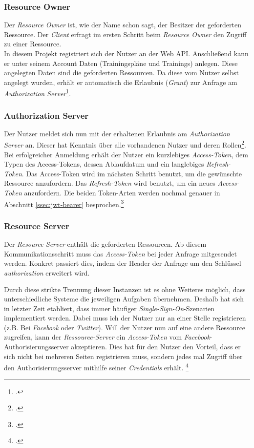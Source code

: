 \subsubsection*{Resource Owner}
Der \textit{Resource Owner} ist, wie der Name schon sagt, der Besitzer der geforderten Ressource. Der \textit{Client} erfragt im ersten Schritt beim \textit{Resource Owner} den Zugriff zu einer Ressource.\\
In diesem Projekt registriert sich der Nutzer an der Web \ac{API}. Anschließend kann er unter seinem Account Daten (Trainingspläne und Trainings) anlegen. Diese angelegten Daten sind die geforderten Ressourcen. Da diese vom Nutzer selbst angelegt wurden, erhält er automatisch die Erlaubnis (\textit{Grant}) zur Anfrage am \textit{Authorization Server}\footcite{online:Implemented_OAuth_WebToken}.
\subsubsection*{Authorization Server}
\label{sssec:authorization-server}
Der Nutzer meldet sich nun mit der erhaltenen Erlaubnis am \textit{Authorization Server} an. Dieser hat Kenntnis über alle vorhandenen Nutzer und deren Rollen\footcite{online:Implemented_OAuth_Roles}. Bei erfolgreicher Anmeldung erhält der Nutzer ein kurzlebiges \textit{Access-Token}, dem Typen des Access-Tokens, dessen Ablaufdatum und ein langlebiges \textit{Refresh-Token}. Das Access-Token wird im nächsten Schritt benutzt, um die gewünschte Ressource anzufordern. Das \textit{Refresh-Token} wird benutzt, um ein neues \textit{Access-Token} anzufordern. Die beiden Token-Arten werden nochmal genauer in Abschnitt \ref{ssec:jwt-bearer} besprochen.\footcite[S. 287]{book:AngularJs:Steyer2015} 
\subsubsection*{Resource Server}
Der \textit{Resource Server} enthält die geforderten Ressourcen. Ab diesem Kommunikationsschritt muss das \textit{Access-Token} bei jeder Anfrage mitgesendet werden. Konkret passiert dies, indem der Header der Anfrage um den Schlüssel \textit{authorization} erweitert wird.

Durch diese strikte Trennung dieser Instanzen ist es ohne Weiteres möglich, dass unterschiedliche Systeme die jeweiligen Aufgaben übernehmen. Deshalb hat sich in letzter Zeit etabliert, dass immer häufiger \textit{Single-Sign-On}-Szenarien implementiert werden. Dabei muss ich der Nutzer nur an einer Stelle registrieren (z.B. Bei \textit{Facebook} oder \textit{Twitter}). Will der Nutzer nun auf eine andere Ressource zugreifen, kann der \textit{Ressource-Server} ein \textit{Access-Token} vom \textit{Facebook}-Authorisierungsserver akzeptieren. Dies hat für den Nutzer den Vorteil, dass er sich nicht bei mehreren Seiten registrieren muss, sondern jedes mal Zugriff über den Authorisierungsserver mithilfe seiner \textit{Credentials} erhält. \footcite[S. 294]{book:AngularJs:Steyer2015} 

